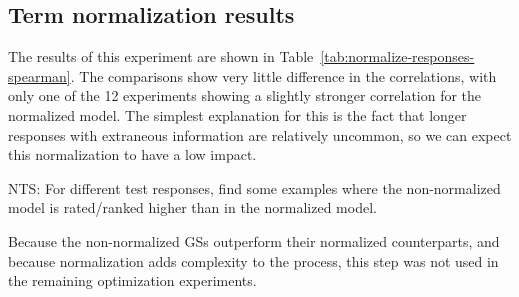 %

\subsection{Term normalization results}
\label{sec:term-norm-results}

The results of this experiment are shown in Table~\ref{tab:normalize-responses-spearman}. The comparisons show very little difference in the correlations, with only one of the 12 experiments showing a slightly stronger correlation for the normalized model. The simplest explanation for this is the fact that longer responses with extraneous information are relatively uncommon, so we can expect this normalization to have a low impact.

\bigskip
NTS: For different test responses, find some examples where the non-normalized model is rated/ranked higher than in the normalized model.

Because the non-normalized GSs outperform their normalized counterparts, and because normalization adds complexity to the process, this step was not used in the remaining optimization experiments.




